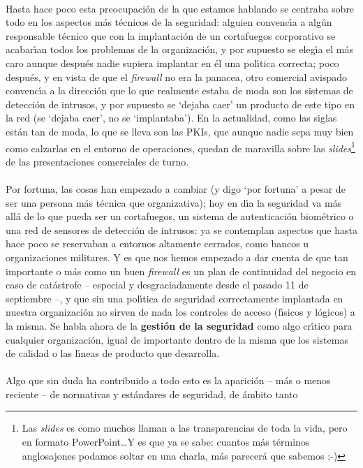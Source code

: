 \\Hasta hace poco esta preocupaci\'on de la que estamos hablando se centraba 
sobre todo en los aspectos m\'as t\'ecnicos de la seguridad: alguien 
convenc\'{\i}a a alg\'un responsable t\'ecnico que con la implantaci\'on de un 
cortafuegos corporativo se acabar\'{\i}an todos los problemas de la 
organizaci\'on, y por supuesto se eleg\'{\i}a el m\'as caro aunque despu\'es
nadie supiera implantar en \'el una pol\'{\i}tica correcta; poco despu\'es, y
en vista de que el {\it firewall} no era la panacea, otro comercial avispado
convenc\'{\i}a a la direcci\'on que lo que realmente estaba de moda son los
sistemas de detecci\'on de intrusos, y por supuesto se `dejaba caer' un producto
de este tipo en la red (se `dejaba caer', no se `implantaba'). En la actualidad,
como las siglas est\'an tan de moda, lo que se lleva son las PKIs, que aunque
nadie sepa muy bien como calzarlas en el entorno de operaciones, quedan de
maravilla sobre las {\it slides}\footnote{Las {\it slides} es como muchos 
llaman a las transparencias de toda la vida, pero en formato 
PowerPoint\ldots Y es que ya se sabe: cuantos m\'as t\'erminos anglosajones
podamos soltar en una charla, m\'as parecer\'a que sabemos ;-)} de las 
presentaciones comerciales de turno.\\
\\Por fortuna, las cosas han empezado a cambiar (y digo `por fortuna' a pesar 
de ser una persona m\'as t\'ecnica que organizativa); hoy en d\'{\i}a la
seguridad va m\'as all\'a de lo que pueda ser un cortafuegos, un sistema de 
autenticaci\'on biom\'etrico o una red de sensores de detecci\'on de intrusos:
ya se contemplan aspectos que hasta hace poco se reservaban a entornos 
altamente cerrados, como bancos u organizaciones militares. Y es que nos hemos
empezado a dar cuenta de que tan importante o m\'as como un buen {\it firewall} 
es un plan de continuidad del negocio en caso de cat\'astrofe -- especial y 
desgraciadamente desde el pasado 11 de septiembre --, y que sin una 
pol\'{\i}tica de seguridad correctamente implantada en nuestra organizaci\'on
no sirven de nada los controles de acceso (f\'{\i}sicos y l\'ogicos) a la
misma. Se habla ahora de la {\bf gesti\'on de la seguridad} como algo 
cr\'{\i}tico para cualquier organizaci\'on, igual de importante dentro de la 
misma que los sistemas de calidad o las l\'{\i}neas de producto que 
desarrolla.\\
\\Algo que sin duda ha contribuido a todo esto es la aparici\'on -- m\'as o
menos reciente -- de normativas y est\'andares de seguridad, de \'ambito tanto

